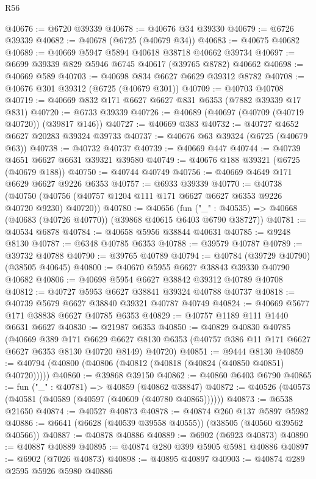\begin{lexlean}{R56}
\begin{coremodule}
@40676 := @6720 @39339
@40678 := @40676 @34 @39330
@40679 := @6726 @39339
@40682 := @40678 (@6725 (@40679 @34))
@40683 := @40675 @40682
@40689 := @40669 @5947 @5894 @40618 @38718 @40662 @39734
@40697 := @6699 @39339 @829 @5946 @6745 @40617 (@39765 @8782) @40662
@40698 := @40669 @589
@40703 := @40698 @834 @6627 @6629 @39312 @8782
@40708 := @40676 @301 @39312 (@6725 (@40679 @301))
@40709 := @40703 @40708
@40719 := @40669 @832 @171 @6627 @6627 @831 @6353 (@7882 @39339 @17 @831)
@40720 := @6733 @39339
@40726 := @40689 (@40697 (@40709 (@40719 @40720)) (@39817 @146))
@40727 := @40669 @383
@40732 := @40727 @4652 @6627 @20283 @39324 @39733
@40737 := @40676 @63 @39324 (@6725 (@40679 @63))
@40738 := @40732 @40737
@40739 := @40669 @447
@40744 := @40739 @4651 @6627 @6631 @39321 @39580
@40749 := @40676 @188 @39321 (@6725 (@40679 @188))
@40750 := @40744 @40749
@40756 := @40669 @4649 @171 @6629 @6627 @9226 @6353
@40757 := @6933 @39339
@40770 := @40738
    (@40750 (@40756 (@40757 @1204 @111 @171 @6627 @6627 @6353 @9226 @40720 @9230) @40720))
@40780 := @40656
    (fun ("_" : @40535) => @40668 (@40683 (@40726 @40770)) (@39868 @40615 @6403 @6790 @38727))
@40781 := @40534 @6878
@40784 := @40658 @5956 @38844 @40631
@40785 := @9248 @8130
@40787 := @6348 @40785 @6353
@40788 := @39579 @40787
@40789 := @39732 @40788
@40790 := @39765 @40789
@40794 := @40784 (@39729 @40790) (@38505 @40645)
@40800 := @40670 @5955 @6627 @38843 @39330 @40790 @40682
@40806 := @40698 @5954 @6627 @38842 @39312 @40789 @40708
@40812 := @40727 @5953 @6627 @38841 @39324 @40788 @40737
@40818 := @40739 @5679 @6627 @38840 @39321 @40787 @40749
@40824 := @40669 @5677 @171 @38838 @6627 @40785 @6353
@40829 := @40757 @1189 @111 @1440 @6631 @6627
@40830 := @21987 @6353
@40850 := @40829
    @40830
    @40785
    (@40669
      @389
      @171
      @6629
      @6627
      @8130
      @6353
      (@40757 @386 @11 @171 @6627 @6627 @6353 @8130 @40720 @8149)
      @40720)
@40851 := @9444 @8130
@40859 := @40794 (@40800 (@40806 (@40812 (@40818 (@40824 (@40850 @40851) @40720)))))
@40860 := @39868 @39150
@40862 := @40860 @6403 @6790
@40865 := fun ("_" : @40781) => @40859 (@40862 @38847)
@40872 := @40526 (@40573 (@40581 (@40589 (@40597 (@40609 (@40780 @40865))))))
@40873 := @6538 @21650
@40874 := @40527 @40873
@40878 := @40874 @260 @137 @5897 @5982
@40886 := @6641 (@6628 (@40539 @39558 @40555)) (@38505 (@40560 @39562 @40566))
@40887 := @40878 @40886
@40889 := @6902 (@6923 @40873)
@40890 := @40887 @40889
@40895 := @40874 @280 @399 @5905 @5981 @40886
@40897 := @6902 (@7026 @40873)
@40898 := @40895 @40897
@40903 := @40874 @289 @2595 @5926 @5980 @40886

\end{coremodule}
\end{lexlean}
